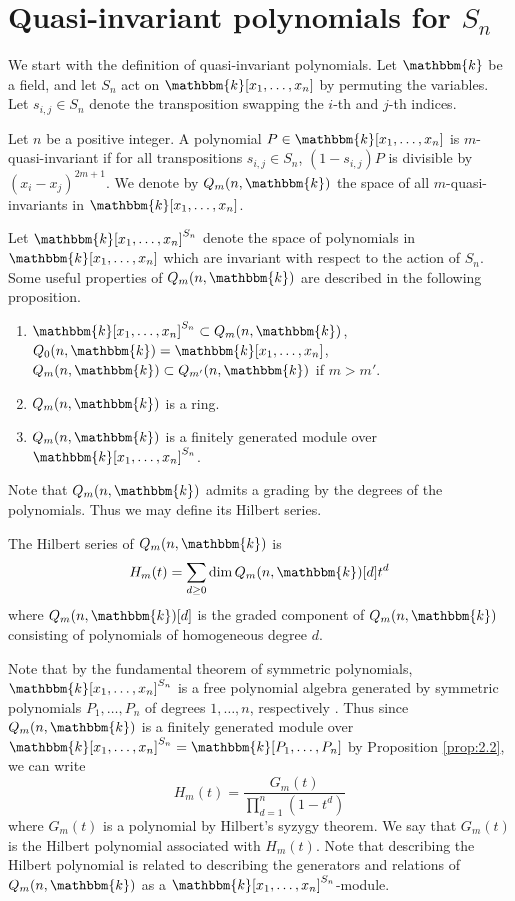 \documentclass[11pt]{article}
\numberwithin{equation}{section}
\theoremstyle{definition}
\numberwithin{equation}{section}
\renewcommand{\k}{\mathbbm{k}}
\begin{document}
\section{Quasi-invariant polynomials for $S_n$}\label{sec:2}

We start with the definition of quasi-invariant polynomials. Let $\k$ be a field, and let $S_n$ act on $\k[x_1,\dots,x_n]$ by permuting the variables. Let $s_{i,j}\in S_n$ denote the transposition swapping the $i$-th and $j$-th indices.

\begin{definition}
    Let $n$ be a positive integer. A polynomial $P\in\k[x_1,\dots,x_n]$ is $m$-quasi-invariant if for all transpositions $s_{i,j}\in S_n$, $(1-s_{i,j})P$ is divisible by $(x_i-x_j)^{2m+1}$. We denote by $Q_m(n,\k)$ the space of all $m$-quasi-invariants in $\k[x_1,\dots,x_n]$. 
\end{definition}

Let $\k[x_1,\dots,x_n]^{S_n}$ denote the space of polynomials in $\k[x_1,\dots,x_n]$ which are invariant with respect to the action of $S_n$. Some useful properties of $Q_m(n,\k)$ are described in the following proposition. 

\begin{proposition}\label{prop:2.2}
    \phantom{.}

    \begin{enumerate}
        \item $\k[x_1,\dots,x_n]^{S_n}\subset Q_m(n,\k)$, $Q_0(n,\k)=\k[x_1,\dots,x_n]$, $Q_m(n,\k)\subset Q_{m'}(n,\k)$ if $m>m'$.
        \item $Q_m(n,\k)$ is a ring.
        \item $Q_m(n,\k)$ is a finitely generated module over $\k[x_1,\dots,x_n]^{S_n}$.
    \end{enumerate}
\end{proposition}

Note that $Q_m(n,\k)$ admits a grading by the degrees of the polynomials. Thus we may define its Hilbert series.

\begin{definition}
    The Hilbert series of $Q_m(n,\k)$ is
    $$H_m(t)=\sum_{d\geq 0}\dim Q_m(n,\k)[d]t^d$$
    where $Q_m(n,\k)[d]$ is the graded component of $Q_m(n,\k)$ consisting of polynomials of homogeneous degree $d$.
\end{definition}

Note that by the fundamental theorem of symmetric polynomials, $\k[x_1,\dots,x_n]^{S_n}$ is a free polynomial algebra generated by symmetric polynomials $P_1,\dots,P_n$ of degrees $1,\dots,n$, respectively \cite{humphreys_1990}. Thus since $Q_m(n,\k)$ is a finitely generated module over $\k[x_1,\dots,x_n]^{S_n}=\k[P_1,\dots,P_n]$ by Proposition \ref{prop:2.2}, we can write
$$H_m(t)=\frac{G_m(t)}{\prod_{d=1}^n(1-t^d)}$$
where $G_m(t)$ is a polynomial by Hilbert's syzygy theorem. We say that $G_m(t)$ is the Hilbert polynomial associated with $H_m(t)$. Note that describing the Hilbert polynomial is related to describing the generators and relations of $Q_m(n,\k)$ as a $\k[x_1,\dots,x_n]^{S_n}$-module.
\end{document}
